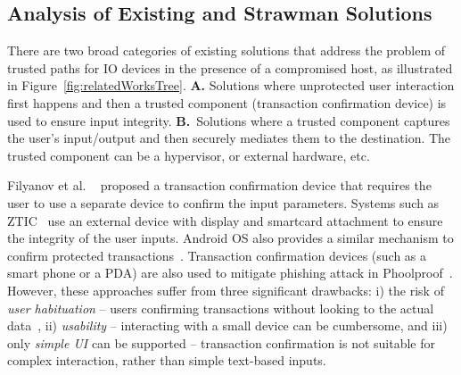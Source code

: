 \subsection{Analysis of Existing and Strawman Solutions}
\label{sec:problemStatement:existingSolution}

There are two broad categories of existing solutions that address the problem of trusted paths for IO devices in the presence of a compromised host, as illustrated in Figure~\ref{fig:relatedWorksTree}. \textbf{A.} Solutions where unprotected user interaction first happens and then a trusted component (transaction confirmation device) is used to ensure input integrity. \textbf{B.}~Solutions where a trusted component captures the user's input/output and then securely mediates them to the destination. The trusted component can be a hypervisor, or external hardware, etc. %

 Filyanov et al. ~\cite{filyanov2011uni} proposed a transaction confirmation device that requires the user to use a separate device to confirm the input parameters. Systems such as ZTIC~\cite{weigold2011secure} use an external device with display and smartcard attachment to ensure the integrity of the user inputs. Android OS also provides a similar mechanism to confirm protected transactions~\cite{android_confirm}. Transaction confirmation devices (such as a smart phone or a PDA) are also used to mitigate phishing attack in Phoolproof~\cite{parno2006phoolproof}.
However, these approaches suffer from three significant drawbacks: i) the risk of \emph{user habituation} -- users confirming transactions without looking to the actual data~\cite{anderson2016warning},
ii) \emph{usability} -- interacting with a small device can be cumbersome, and iii) only \emph{simple UI} can be supported -- transaction confirmation is not suitable for complex interaction, rather than simple text-based inputs.


